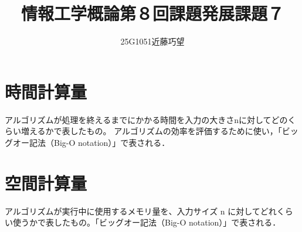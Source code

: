 \documentclass[uplatex]{jsarticle}
\begin{document}
\title{情報工学概論第８回課題発展課題７}
\author{25G1051近藤巧望}
\maketitle

\section{時間計算量}

アルゴリズムが処理を終えるまでにかかる時間を入力の大きさnに対してどのくらい増えるかで表したもの。
アルゴリズムの効率を評価するために使い，「ビッグオー記法（Big-O notation）」で表される．

\section{空間計算量}

アルゴリズムが実行中に使用するメモリ量を、入力サイズ n に対してどれくらい使うかで表したもの。「ビッグオー記法（Big-O notation）」で表される．
\end{document}
